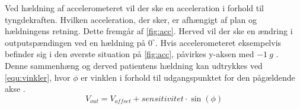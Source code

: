 \noindent
Ved hældning af accelerometeret vil der ske en acceleration i forhold til tyngdekraften. Hvilken acceleration, der sker, er afhængigt af plan og hældningens retning. Dette fremgår af \autoref{fig:acc}. Herved vil der ske en ændring i outputspændingen ved en hældning på $0^{\circ}$. Hvis accelerometeret eksempelvis befinder sig i den øverste situation på \autoref{fig:acc}, påvirkes y-aksen med $-1~g$ \citep{clifford2005}. Denne sammenhæng og derved patientens hældning kan udtrykkes ved \autoref{equ:vinkler}, hvor $\phi$ er vinklen i forhold til udgangspunktet for den pågældende akse \citep{clifford2005}.
\begin{equation} \label{equ:vinkler}
	V_{out} = V_{offset} + sensitivitet \cdot \sin(\phi)
\end{equation}